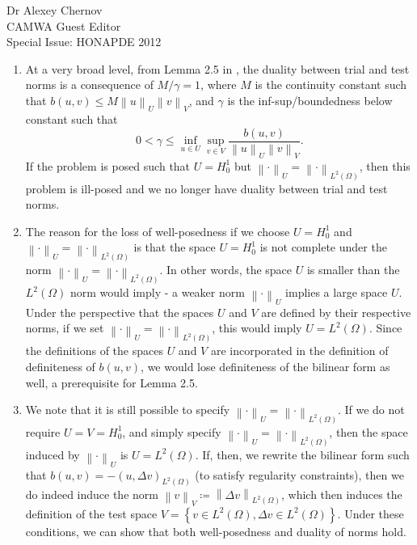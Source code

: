 \documentclass{letter}
\newcommand{\nor}[1]{\left\| #1 \right\|}
\newcommand{\LRp}[1]{\left( #1 \right)}
\newcommand{\LRc}[1]{\left\{ #1 \right\}}
\renewcommand{\L}{L^2\LRp{\Omega}}
\newcommand{\del}{\Delta}
\begin{document}
\begin{letter}{Dr Alexey Chernov\\CAMWA Guest Editor\\Special Issue: HONAPDE 2012}
\begin{enumerate}
\begin{enumerate}
\begin{enumerate}
\item At a very broad level, from Lemma 2.5 in \cite{Bui-ThanhDemkowiczGhattas11a}, the duality between trial and test norms is a consequence of $M/\gamma = 1$, where $M$ is the continuity constant such that $b(u,v)\leq M \nor{u}_U\nor{v}_V$, and $\gamma$ is the inf-sup/boundedness below constant such that 
\[
0<\gamma \leq \inf_{u\in U}\sup_{v\in V}\frac{b(u,v)}{\nor{u}_U\nor{v}_V}.
\]
If the problem is posed such that $U = H_0^1$ but $\nor{\cdot}_U = \nor{\cdot}_{\L}$, then this problem is ill-posed and we no longer have duality between trial and test norms.  

\item The reason for the loss of well-posedness if we choose $U = H_0^1$ and $\nor{\cdot}_U = \nor{\cdot}_{\L}$ is that the space $U = H_0^1$ is not complete under the norm $\nor{\cdot}_U = \nor{\cdot}_{\L}$.  In other words, the space $U$ is smaller than the $\L$ norm would imply - a weaker norm $\nor{\cdot}_U$ implies a large space $U$.  Under the perspective that the spaces $U$ and $V$ are defined by their respective norms, if we set $\nor{\cdot}_U = \nor{\cdot}_{\L}$, this would imply $U = \L$. Since the definitions of the spaces $U$ and $V$ are incorporated in the definition of definiteness of $b(u,v)$, we would lose definiteness of the bilinear form as well, a prerequisite for Lemma 2.5.  
\item We note that it is still possible to specify $\nor{\cdot}_U = \nor{\cdot}_{\L}$.  If we do not require $U = V = H_0^1$, and simply specify $\nor{\cdot}_U = \nor{\cdot}_{\L}$, then the space induced by $\nor{\cdot}_U$ is $U = \L$.  If, then, we rewrite the bilinear form such that $b(u,v) = -\LRp{u,\del v}_{\L}$ (to satisfy regularity constraints), then we do indeed induce the norm $\nor{v}_V \coloneqq \nor{\del v}_{\L}$, which then induces the definition of the test space $V = \LRc{v\in \L, \del v\in \L}$.  Under these conditions, we can show that both well-posedness and duality of norms hold.  


\end{enumerate}
\end{enumerate}
\end{enumerate}
\end{letter}
\end{document}
